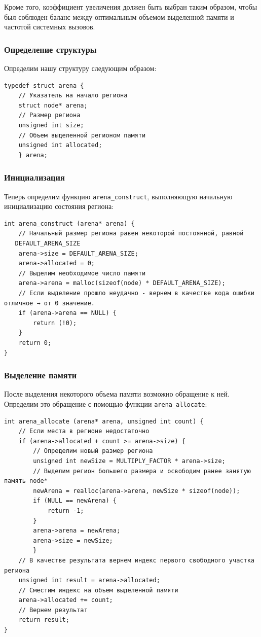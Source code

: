 \documentclass[bachelor, och, otchet]{SCWorks}
\begin{document}
Кроме того, коэффициент увеличения должен быть выбран таким образом, чтобы был
соблюден баланс между оптимальным объемом выделенной памяти и частотой системных
вызовов.

\subsubsection{Определение структуры}
Определим нашу структуру следующим образом:

\begin{verbatim}
typedef struct arena { 
    // Указатель на начало региона 
    struct node* arena; 
    // Размер региона 
    unsigned int size; 
    // Объем выделенной регионом памяти
    unsigned int allocated; 
    } arena;
\end{verbatim}

\subsubsection{Инициализация}
Теперь определим функцию \verb|arena_construct|, выполняющую начальную
инициализацию состояния региона:

\begin{verbatim}
int arena_construct (arena* arena) { 
    // Начальный размер региона равен некоторой постоянной, равной 
   DEFAULT_ARENA_SIZE
    arena->size = DEFAULT_ARENA_SIZE; 
    arena->allocated = 0; 
    // Выделим необходимое число памяти 
    arena->arena = malloc(sizeof(node) * DEFAULT_ARENA_SIZE); 
    // Если выделение прошло неудачно - вернем в качестве кода ошибки отличное → от 0 значение. 
    if (arena->arena == NULL) { 
        return (!0); 
    } 
    return 0; 
}
\end{verbatim}

\subsubsection{Выделение памяти}
После выделения некоторого объема памяти возможно обращение к ней. Определим это
обращение с помощью функции \verb|arena_allocate|:

\begin{verbatim}
int arena_allocate (arena* arena, unsigned int count) { 
    // Если места в регионе недостаточно 
    if (arena->allocated + count >= arena->size) { 
        // Определим новый размер региона 
        unsigned int newSize = MULTIPLY_FACTOR * arena->size;
        // Выделим регион большего размера и освободим ранее занятую память node*
        newArena = realloc(arena->arena, newSize * sizeof(node)); 
        if (NULL == newArena) { 
            return -1; 
        } 
        arena->arena = newArena; 
        arena->size = newSize; 
        }
    // В качестве результата вернем индекс первого свободного участка региона
    unsigned int result = arena->allocated; 
    // Сместим индекс на объем выделенной памяти 
    arena->allocated += count; 
    // Вернем результат 
    return result; 
}
\end{verbatim}
\end{document}
